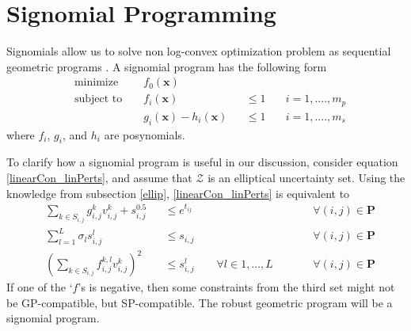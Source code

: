 \section{Signomial Programming} \label{sigProg}
Signomials allow us to solve non log-convex optimization problem as sequential geometric programs \cite{MARANAS1997351}. A signomial program has the following form
\begin{equation}
\begin{aligned}
&\text{minimize } &&f_{0}(\mathbf{x})\\
&\text{subject to } &&f_{i}(\mathbf{x}) &&\leq 1 \quad &i = 1, ...., m_p\\
& &&g_{i}(\mathbf{x}) -  h_{i}(\mathbf{x}) &&\leq 1 \quad &i = 1, ...., m_s
\end{aligned}
\label{sp}
\end{equation}
where $f_{i}$, $g_{i}$, and $h_{i}$ are posynomials.

To clarify how a signomial program is useful in our discussion, consider equation \eqref{linearCon_linPerts}, and assume that $\mathcal{Z}$ is an elliptical uncertainty set. Using the knowledge from subsection \ref{ellip}, \eqref{linearCon_linPerts} is equivalent to
\begin{equation}
\begin{aligned}
&\textstyle{\sum}_{k \in S_{i,j}}g_{i,j}^k v_{i,j}^k + s_{i,j}^{0.5} && \leq e^{t_{ij}} \qquad && \forall (i, j) \in \mathbf{P}\\
&\textstyle{\sum}_{l=1}^L \sigma_l s_{i,j}^{l} && \leq s_{i,j} \qquad && \forall (i, j) \in \mathbf{P}\\
&\left(\textstyle{\sum}_{k \in S_{i,j}}f_{i,j}^{k,l}v_{i,j}^k\right)^2 && \leq s_{i,j}^{l} \qquad \forall l \in 1,...,L \qquad && \forall (i, j) \in \mathbf{P}
\end{aligned}
\label{sp_compatible_constraints}
\end{equation}
If one of the `$f$'s is negative, then some constraints from the third set might not be GP-compatible, but SP-compatible. The robust geometric program will be a signomial program.
\begin{comment}
\end{comment}